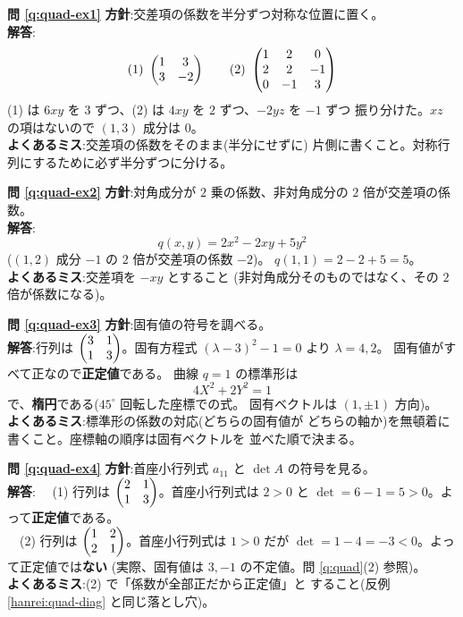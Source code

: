 \bigskip
\noindent\textbf{問 \ref{q:quad-ex1}}\quad
\textbf{方針}:交差項の係数を半分ずつ対称な位置に置く。\\
\textbf{解答}:
\[
\text{(1)}\ \begin{pmatrix}1 & 3 \\ 3 & -2\end{pmatrix} \qquad
\text{(2)}\ \begin{pmatrix}1 & 2 & 0 \\ 2 & 2 & -1 \\ 0 & -1 & 3\end{pmatrix}
\]
(1) は $6xy$ を $3$ ずつ、(2) は $4xy$ を $2$ ずつ、$-2yz$ を $-1$ ずつ
振り分けた。$xz$ の項はないので $(1, 3)$ 成分は $0$。\\
\textbf{よくあるミス}:交差項の係数をそのまま(半分にせずに)
片側に書くこと。対称行列にするために必ず半分ずつに分ける。

\bigskip
\noindent\textbf{問 \ref{q:quad-ex2}}\quad
\textbf{方針}:対角成分が $2$ 乗の係数、非対角成分の $2$ 倍が交差項の係数。\\
\textbf{解答}:
\[
q(x, y) = 2x^2 - 2xy + 5y^2
\]
($(1,2)$ 成分 $-1$ の $2$ 倍が交差項の係数 $-2$)。
$q(1, 1) = 2 - 2 + 5 = 5$。\\
\textbf{よくあるミス}:交差項を $-xy$ とすること
(非対角成分そのものではなく、その $2$ 倍が係数になる)。

\bigskip
\noindent\textbf{問 \ref{q:quad-ex3}}\quad
\textbf{方針}:固有値の符号を調べる。\\
\textbf{解答}:行列は $\begin{pmatrix}3 & 1 \\ 1 & 3\end{pmatrix}$。固有方程式
$(\lambda - 3)^2 - 1 = 0$ より $\lambda = 4, 2$。
固有値がすべて正なので\textbf{正定値}である。
曲線 $q = 1$ の標準形は
\[
4X^2 + 2Y^2 = 1
\]
で、\textbf{楕円}である($45^\circ$ 回転した座標での式。
固有ベクトルは $(1, \pm 1)$ 方向)。\\
\textbf{よくあるミス}:標準形の係数の対応(どちらの固有値が
どちらの軸か)を無頓着に書くこと。座標軸の順序は固有ベクトルを
並べた順で決まる。

\bigskip
\noindent\textbf{問 \ref{q:quad-ex4}}\quad
\textbf{方針}:首座小行列式 $a_{11}$ と $\det A$ の符号を見る。\\
\textbf{解答}:
　(1) 行列は $\begin{pmatrix}2 & 1 \\ 1 & 3\end{pmatrix}$。首座小行列式は $2 > 0$ と
$\det = 6 - 1 = 5 > 0$。よって\textbf{正定値}である。\\
　(2) 行列は $\begin{pmatrix}1 & 2 \\ 2 & 1\end{pmatrix}$。首座小行列式は $1 > 0$ だが
$\det = 1 - 4 = -3 < 0$。よって正定値では\textbf{ない}
(実際、固有値は $3, -1$ の不定値。問 \ref{q:quad}(2) 参照)。\\
\textbf{よくあるミス}:(2) で「係数が全部正だから正定値」と
すること(反例 \ref{hanrei:quad-diag} と同じ落とし穴)。

